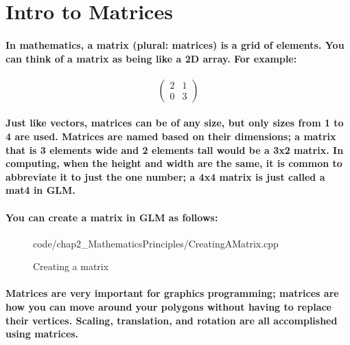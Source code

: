 \section{\textsf{Intro to Matrices}}

\paragraph{
    In mathematics, a matrix (plural: matrices) is a grid of elements. You can think of a matrix as being like a 2D array. For example:
}

\paragraph{
    \begin{equation*}
    \begin{pmatrix}
    2 & 1\\
    0 & 3
    \end{pmatrix}
    \end{equation*}
}

\paragraph{
    Just like vectors, matrices can be of any size, but only sizes from 1 to 4 are used. Matrices are named based on their dimensions; a matrix that is 3 elements wide and 2 elements tall would be a 3x2 matrix. In computing, when the height and width are the same, it is common to abbreviate it to just the one number; a 4x4 matrix is just called a mat4 in GLM.
}

\paragraph{
    You can create a matrix in GLM as follows:
}

\begin{frame}{}
    \begin{figure}[ht]
    \centering
    \colorbox{backgroundcolor}{
        \parbox{0.9\textwidth}{
            
            {code/chap2_MathematicsPrinciples/CreatingAMatrix.cpp}
        }
    }
    \caption{Creating a matrix}
    \label{fig:creating_a_matrix}
    \end{figure}
\end{frame}

\paragraph{
    Matrices are very important for graphics programming; matrices are how you can move around your polygons without having to replace their vertices. Scaling, translation, and rotation are all accomplished using matrices.
}

